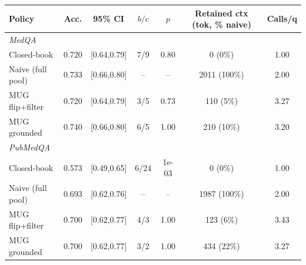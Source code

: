 \begin{tabular}{lcccccc}
\toprule
Policy & Acc. & 95\% CI & $b/c$ & $p$ & Retained ctx (tok, \% naive) & Calls/q \\
\midrule
\multicolumn{7}{l}{\textit{MedQA}} \\
Closed-book & 0.720 & [0.64,0.79] & 7/9 & 0.80 & 0 (0\%) & 1.00 \\
Naive (full pool) & 0.733 & [0.66,0.80] & -- & -- & 2011 (100\%) & 2.00 \\
MUG flip+filter & 0.720 & [0.64,0.79] & 3/5 & 0.73 & 110 (5\%) & 3.27 \\
MUG grounded & 0.740 & [0.66,0.80] & 6/5 & 1.00 & 210 (10\%) & 3.20 \\
\midrule
\multicolumn{7}{l}{\textit{PubMedQA}} \\
Closed-book & 0.573 & [0.49,0.65] & 6/24 & 1e-03 & 0 (0\%) & 1.00 \\
Naive (full pool) & 0.693 & [0.62,0.76] & -- & -- & 1987 (100\%) & 2.00 \\
MUG flip+filter & 0.700 & [0.62,0.77] & 4/3 & 1.00 & 123 (6\%) & 3.43 \\
MUG grounded & 0.700 & [0.62,0.77] & 3/2 & 1.00 & 434 (22\%) & 3.27 \\
\bottomrule
\end{tabular}
